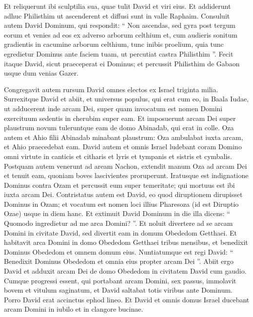 \begin{biblechapter}
\begin{biblechapter}
\begin{biblechapter}
\begin{biblechapter}
\begin{biblechapter}
\verse Et reliquerunt ibi sculptilia sua, quae tulit David et viri eius.
 \verse Et addiderunt adhuc Philisthim ut ascenderent et diffusi sunt in valle Raphaim. 
\verse Consuluit autem David Dominum, qui respondit: “ Non ascendas, sed gyra post tergum eorum et venies ad eos ex adverso arborum celthium 
\verse et, cum audieris sonitum gradientis in cacumine arborum celthium, tunc inibis proelium, quia tunc egredietur Dominus ante faciem tuam, ut percutiat castra Philisthim ”. 
\verse Fecit itaque David, sicut praeceperat ei Dominus; et percussit Philisthim de Gabaon usque dum venias Gazer.
 
\begin{biblechapter}
\verse Congregavit autem rursum David omnes electos ex Israel triginta milia. 
\verse Surrexitque David et abiit, et universus populus, qui erat cum eo, in Baala Iudae, ut adducerent inde arcam Dei, super quam invocatum est nomen Domini exercituum sedentis in cherubim super eam. 
\verse Et imposuerunt arcam Dei super plaustrum novum tuleruntque eam de domo Abinadab, qui erat in colle. Oza autem et Ahio filii Abinadab minabant plaustrum: 
\verse Oza ambulabat iuxta arcam, et Ahio praecedebat eam. 
\verse David autem et omnis Israel ludebant coram Domino omni virtute in canticis et citharis et lyris et tympanis et sistris et cymbalis.
 \verse Postquam autem venerunt ad aream Nachon, extendit manum Oza ad arcam Dei et tenuit eam, quoniam boves lascivientes proruperunt. 
\verse Iratusque est indignatione Dominus contra Ozam et percussit eum super temeritate; qui mortuus est ibi iuxta arcam Dei. 
\verse Contristatus autem est David, eo quod diruptionem dirupisset Dominus in Ozam; et vocatum est nomen loci illius Pharesoza (id est Diruptio Ozae) usque in diem hanc. 
\verse Et extimuit David Dominum in die illa dicens: “ Quomodo ingredietur ad me arca Domini? ”. 
\verse Et noluit divertere ad se arcam Domini in civitate David, sed divertit eam in domum Obededom Getthaei. 
\verse Et habitavit arca Domini in domo Obededom Getthaei tribus mensibus, et benedixit Dominus Obededom et omnem domum eius.
 \verse Nuntiatumque est regi David: “ Benedixit Dominus Obededom et omnia eius propter arcam Dei ”. Abiit ergo David et adduxit arcam Dei de domo Obededom in civitatem David cum gaudio. 
\verse Cumque progressi essent, qui portabant arcam Domini, sex passus, immolavit bovem et vitulum saginatum, 
\verse et David saltabat totis viribus ante Dominum. Porro David erat accinctus ephod lineo. 
 \verse Et David et omnis domus Israel ducebant arcam Domini in iubilo et in clangore bucinae. 

\end{biblechapter}
\end{biblechapter}
\end{biblechapter}
\end{biblechapter}
\end{biblechapter}
\end{biblechapter}
